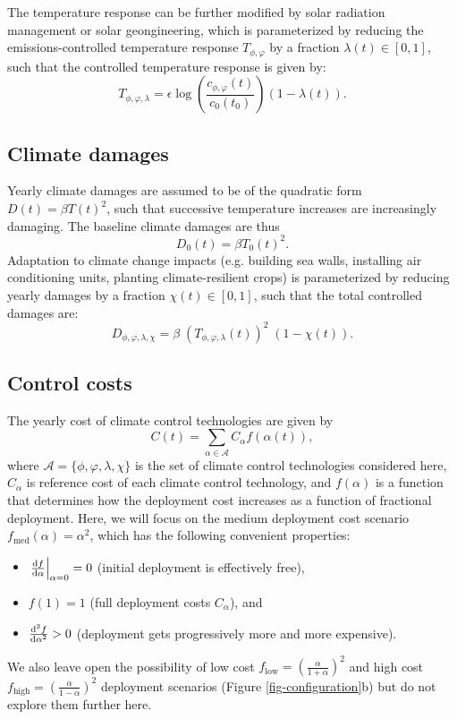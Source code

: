 \documentclass{article}
\begin{document}
The temperature response can be further modified by solar radiation management or solar geongineering, which is parameterized by reducing the emissions-controlled temperature response $T_{\phi,\varphi}$ by a fraction $\lambda(t) \in [0,1]$, such that the controlled temperature response is given by:
\begin{equation}
    T_{\phi, \varphi, \lambda} = \epsilon \log(\frac{c_{\phi,\varphi}(t)}{c_{0}(t_{0})})(1 - \lambda(t)).
\end{equation}

\subsection{Climate damages}

Yearly climate damages are assumed to be of the quadratic form $D(t) = \beta T(t)^{2}$, such that successive temperature increases are increasingly damaging. The baseline climate damages are thus
\begin{equation}
    D_{0}(t) = \beta T_{0}(t)^{2}.
\end{equation}
Adaptation to climate change impacts (e.g. building sea walls, installing air conditioning units, planting climate-resilient crops) is parameterized by reducing yearly damages by a fraction $\chi(t) \in [0,1]$, such that the total controlled damages are:
\begin{equation}
    D_{\phi, \varphi, \lambda, \chi} = \beta \; (T_{\phi, \varphi, \lambda}(t))^{2} \; (1-\chi(t)).
\end{equation}

\subsection{Control costs}

The yearly cost of climate control technologies are given by
\begin{equation}
    C(t) = \sum_{\alpha \in \mathcal{A}} C_{\alpha} f(\alpha(t)),
\end{equation}
where $\mathcal{A} = \{ \phi, \varphi, \lambda, \chi \}$ is the set of climate control technologies considered here, $C_{\alpha}$ is reference cost of each climate control technology, and $f(\alpha)$ is a function that determines how the deployment cost increases as a function of fractional deployment. Here, we will focus on the medium deployment cost scenario $f_{\text{med}}(\alpha) = \alpha^{2}$, which has the following convenient properties: 
\begin{itemize}
    \item $\left. \dv{f}{\alpha}\right|_{\alpha=0} = 0$ (initial deployment is effectively free),
    \item $f(1) = 1$ (full deployment costs $C_{\alpha}$), and
    \item $\dv[2]{f}{\alpha} > 0$ (deployment gets progressively more and more expensive).
\end{itemize}
We also leave open the possibility of low cost $f_{\text{low}} = \left( \frac{\alpha}{1+\alpha} \right)^{2}$ and high cost $f_{\text{high}} = \left( \frac{\alpha}{1-\alpha} \right)^{2}$ deployment scenarios (Figure \ref{fig-configuration}b) but do not explore them further here. 
\end{document}
